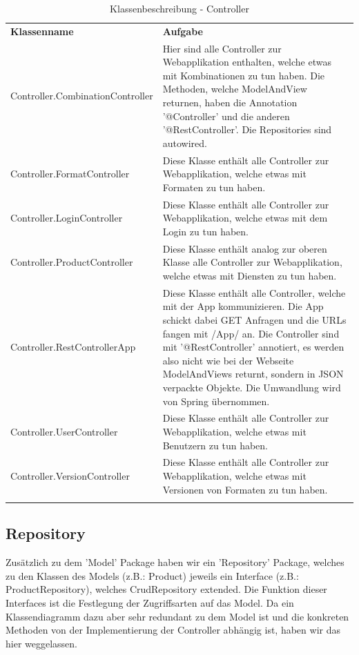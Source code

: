 \begin{table}[h]
	\centering
	\begin{tabularx}{\textwidth}{X X}
		\rowcolor[HTML]{C0C0C0}
		\textbf{Klassenname} & \textbf{Aufgabe} \\
		Controller.CombinationController & Hier sind alle Controller zur Webapplikation enthalten, welche etwas mit Kombinationen zu tun haben.
		Die Methoden, welche ModelAndView returnen, haben die Annotation '@Controller' und die anderen '@RestController'.
		Die Repositories sind autowired.  \\
		\rowcolor[HTML]{E7E7E7}
		Controller.FormatController  & Diese Klasse enthält alle Controller zur Webapplikation, welche etwas mit Formaten zu tun haben. \\
    	Controller.LoginController & Diese Klasse enthält alle Controller zur Webapplikation, welche etwas mit dem Login zu tun haben.\\
		\rowcolor[HTML]{E7E7E7}
		Controller.ProductController & Diese Klasse enthält analog zur oberen Klasse alle Controller zur Webapplikation, welche etwas mit Diensten zu tun haben. \\
		Controller.RestControllerApp & Diese Klasse enthält alle Controller, welche mit der App kommunizieren.
		Die App schickt dabei GET Anfragen und die URLs fangen mit /App/ an.
		Die Controller sind mit '@RestController' annotiert, es werden also nicht wie bei der Webseite ModelAndViews returnt, sondern in JSON verpackte 		Objekte.
		Die Umwandlung wird von Spring übernommen. \\
		\rowcolor[HTML]{E7E7E7}
		Controller.UserController  & Diese Klasse enthält alle Controller zur Webapplikation, welche etwas mit Benutzern zu tun haben.\\
		Controller.VersionController  & Diese Klasse enthält alle Controller zur Webapplikation, welche etwas mit Versionen von Formaten zu tun haben.\\
		\rowcolor[HTML]{E7E7E7}
	\end{tabularx}
	\caption{Klassenbeschreibung - Controller}
	\label{table:klassenbeschreibung-controller}
\end{table}
\FloatBarrier
\subsection{Repository}
Zusätzlich zu dem 'Model' Package haben wir ein 'Repository' Package, welches zu den Klassen des Models (z.B.: Product) jeweils ein Interface (z.B.: ProductRepository), welches CrudRepository extended.
Die Funktion dieser Interfaces ist die Festlegung der Zugriffsarten auf das Model.
 Da ein Klassendiagramm dazu aber sehr redundant zu dem Model ist und die konkreten Methoden von der Implementierung der Controller abhängig ist, haben wir das hier weggelassen.

